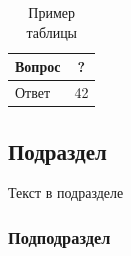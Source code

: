 \documentclass[intlimits,twoside,a4paper,11pt]{article}
\begin{document}
\begin{table}[H]
\centering
\caption{Пример таблицы}
\label{table-example}
\small
\begin{tabular}{|p{5cm}|c|}
	\hline
	\centering
	Вопрос & ? \\
	\hline
	Ответ & 42 \\
	\hline
\end{tabular}
\end{table}

\subsection{Подраздел}
Текст в подразделе
\subsubsection{Подподраздел}
\end{document}
